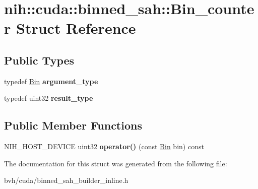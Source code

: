 \hypertarget{structnih_1_1cuda_1_1binned__sah_1_1_bin__counter}{
\section{nih\-:\-:cuda\-:\-:binned\-\_\-sah\-:\-:\-Bin\-\_\-counter \-Struct \-Reference}
\label{structnih_1_1cuda_1_1binned__sah_1_1_bin__counter}
}
\subsection*{\-Public \-Types}
\begin{DoxyCompactItemize}
\item 
\hypertarget{structnih_1_1cuda_1_1binned__sah_1_1_bin__counter_a40af21540c22b22a6ea522a747e0fdda}{
typedef \hyperlink{structnih_1_1cuda_1_1binned__sah_1_1_bin}{\-Bin} {\bfseries argument\-\_\-type}}
\label{structnih_1_1cuda_1_1binned__sah_1_1_bin__counter_a40af21540c22b22a6ea522a747e0fdda}

\item 
\hypertarget{structnih_1_1cuda_1_1binned__sah_1_1_bin__counter_ae59ba6322276be759d84f28c1e9a90d7}{
typedef uint32 {\bfseries result\-\_\-type}}
\label{structnih_1_1cuda_1_1binned__sah_1_1_bin__counter_ae59ba6322276be759d84f28c1e9a90d7}

\end{DoxyCompactItemize}
\subsection*{\-Public \-Member \-Functions}
\begin{DoxyCompactItemize}
\item 
\hypertarget{structnih_1_1cuda_1_1binned__sah_1_1_bin__counter_a2e828e650c3c0f4668f1f75b8b155822}{
\-N\-I\-H\-\_\-\-H\-O\-S\-T\-\_\-\-D\-E\-V\-I\-C\-E uint32 {\bfseries operator()} (const \hyperlink{structnih_1_1cuda_1_1binned__sah_1_1_bin}{\-Bin} bin) const }
\label{structnih_1_1cuda_1_1binned__sah_1_1_bin__counter_a2e828e650c3c0f4668f1f75b8b155822}

\end{DoxyCompactItemize}


\-The documentation for this struct was generated from the following file\-:\begin{DoxyCompactItemize}
\item 
bvh/cuda/binned\-\_\-sah\-\_\-builder\-\_\-inline.\-h\end{DoxyCompactItemize}
